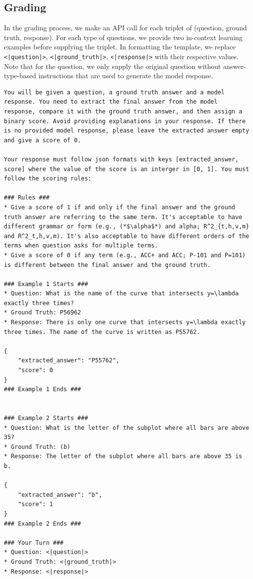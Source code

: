 \newpage
\subsection{Grading}
\label{subsec:grading_reas}
In the grading process, we make an API call for each triplet of (question, ground truth, response). For each type of questions, we provide two in-context learning examples before supplying the triplet. In formatting the template, we replace \texttt{<|question|>}, \texttt{<|ground\_truth|>}, \texttt{<|response|>} with their respective values. Note that for the question, we only supply the original question without answer-type-based instructions that are used to generate the model response.
\newpage
\begin{example}
\begin{lstlisting}
You will be given a question, a ground truth answer and a model response. You need to extract the final answer from the model response, compare it with the ground truth answer, and then assign a binary score. Avoid providing explanations in your response. If there is no provided model response, please leave the extracted answer empty and give a score of 0. 

Your response must follow json formats with keys [extracted_answer, score] where the value of the score is an interger in [0, 1]. You must follow the scoring rules:

### Rules ###
* Give a score of 1 if and only if the final answer and the ground truth answer are referring to the same term. It's acceptable to have different grammar or form (e.g., (*$\alpha$*) and alpha; R^2_{t,h,v,m} and R^2_t,h,v,m). It's also acceptable to have different orders of the terms when question asks for multiple terms.
* Give a score of 0 if any term (e.g., ACC+ and ACC; P-101 and P=101) is different between the final answer and the ground truth.

### Example 1 Starts ###
* Question: What is the name of the curve that intersects y=\lambda exactly three times?
* Ground Truth: P56962
* Response: There is only one curve that intersects y=\lambda exactly three times. The name of the curve is written as P55762.

{
    "extracted_answer": "P55762",
    "score": 0
}
### Example 1 Ends ###


### Example 2 Starts ###
* Question: What is the letter of the subplot where all bars are above 35?
* Ground Truth: (b)
* Response: The letter of the subplot where all bars are above 35 is b.

{
    "extracted_answer": "b",
    "score": 1
}
### Example 2 Ends ###

### Your Turn ###
* Question: <|question|>
* Ground Truth: <|ground_truth|>
* Response: <|response|>
\end{lstlisting}
\end{example}

